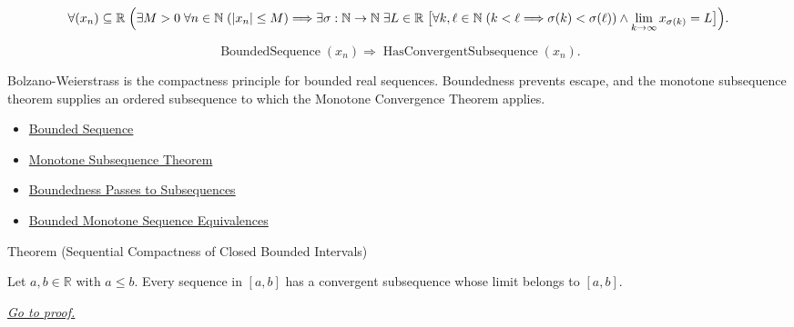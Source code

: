\begin{remark*}
\[
\forall (x_n)\subseteq\mathbb{R}\;
\Bigl(
  \exists M>0\;\forall n\in\mathbb{N}\;(|x_n|\le M)
  \Longrightarrow
  \exists \sigma:\mathbb{N}\to\mathbb{N}\;\exists L\in\mathbb{R}\;
  \bigl[
    \forall k,\ell\in\mathbb{N}\;(k<\ell\Longrightarrow\sigma(k)<\sigma(\ell))
    \land
    \lim_{k\to\infty}x_{\sigma(k)}=L
  \bigr]
\Bigr).
\]
\end{remark*}

\begin{remark*}
\[
\operatorname{BoundedSequence}(x_n)
\Longrightarrow
\operatorname{HasConvergentSubsequence}(x_n).
\]
\end{remark*}

\begin{remark*}[Interpretation]
Bolzano-Weierstrass is the compactness principle for bounded real sequences.
Boundedness prevents escape, and the monotone subsequence theorem supplies an
ordered subsequence to which the Monotone Convergence Theorem applies.
\end{remark*}

\begin{dependencies}
\begin{itemize}
  \item \hyperref[def:bounded-sequence]{Bounded Sequence}
  \item \hyperref[thm:monotone-subsequence-theorem]{Monotone Subsequence Theorem}
  \item \hyperref[thm:boundedness-passes-to-subsequences]{Boundedness Passes to Subsequences}
  \item \hyperref[thm:bounded-monotone-sequence-equivalences]{Bounded Monotone Sequence Equivalences}
\end{itemize}
\end{dependencies}


\begin{theorembox}{Theorem (Sequential Compactness of Closed Bounded Intervals)}
\begin{theorem}
\label{thm:sequential-compactness-closed-bounded-interval}
Let $a,b\in\mathbb{R}$ with $a\le b$. Every sequence in $[a,b]$ has a
convergent subsequence whose limit belongs to $[a,b]$.

\smallskip
\noindent
\hyperref[prf:sequential-compactness-closed-bounded-interval]{\textit{Go to proof.}}
\end{theorem}
\end{theorembox}

